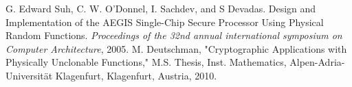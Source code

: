 \documentclass[letterpaper, 10 pt, conference]{ieeeconf}  %
\begin{document}
\addtolength{\textheight}{-12cm}   %

















\begin{thebibliography}{99}

 G. Edward Suh, C. W. O'Donnel, I. Sachdev, and S Devadas. Design and Implementation of the AEGIS Single-Chip Secure Processor Using Physical Random Functions. \emph{Proceedings of the 32nd annual international symposium on Computer Architecture}, 2005.
 M. Deutschman, "Cryptographic Applications with Physically Unclonable Functions," M.S. Thesis, Inst. Mathematics, Alpen-Adria-Universit\"{a}t Klagenfurt, Klagenfurt, Austria, 2010.
 
\end{thebibliography}
\end{document}
